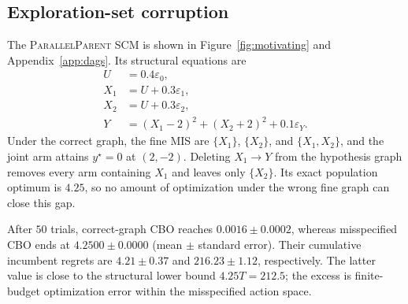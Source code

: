 \documentclass[twoside]{article}
\begin{document}
\begin{table}[t]
\centering
\caption{Evaluation map. Arrow up for maximization and down for minimization objective give the objective direction.}
\label{tab:experiment-map}
\small
{}
\end{table}

\subsection{Exploration-set corruption}
\label{sec:exp-a}

The \textsc{ParallelParent} SCM is shown in Figure~\ref{fig:motivating} and
Appendix~\ref{app:dags}. Its structural equations are
\begin{equation}
 \begin{aligned}
 U&=0.4\varepsilon_0,\\ X_1&=U+0.3\varepsilon_1,\\
 X_2&=U+0.3\varepsilon_2,\\
 Y&=(X_1-2)^2+(X_2+2)^2
  +0.1\varepsilon_Y.
 \end{aligned}
 \label{eq:parallel-parent-scm}
\end{equation}
Under the correct graph, the fine MIS are
$\{X_1\}$, $\{X_2\}$, and $\{X_1,X_2\}$, and the joint arm attains
$y^\star=0$ at $(2,-2)$. Deleting $X_1\to Y$ from the hypothesis graph removes every arm containing $X_1$ and leaves only $\{X_2\}$. Its exact population optimum is $4.25$, so no amount of optimization under the wrong fine graph can close this gap.

After $50$ trials, correct-graph CBO reaches $0.0016\pm0.0002$, whereas misspecified CBO ends at $4.2500\pm0.0000$ (mean $\pm$ standard error). Their cumulative incumbent regrets are $4.21\pm0.37$ and $216.23\pm1.12$, respectively. The latter value is close to the structural lower bound $4.25T=212.5$; the excess is finite-budget optimization error within the misspecified action space.
\end{document}
